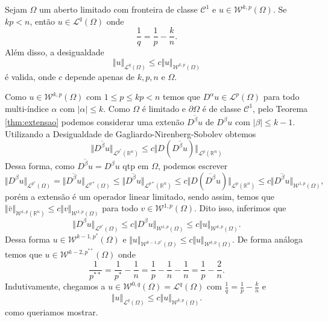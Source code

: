 \documentclass[a4paper, 11pt]{book}
\theoremstyle{definition}
\newcommand{\bR}{\mathbb{R}}
\newcommand{\cC}{\mathcal{C}}
\newcommand{\cL}{\mathcal{L}}
\newcommand{\cW}{\mathcal{W}}
\begin{document}
\begin{tbox} \label{thm:geral-1}
    Sejam $\Omega$ um aberto limitado com fronteira de classe $\cC^1$ e $u \in \cW^{k,p}(\Omega)$.
    Se $kp < n$, então $u \in \cL^q(\Omega)$ onde
    \[
        \frac{1}{q} = \frac{1}{p} - \frac{k}{n}.
    \]
    Além disso, a desigualdade
    \[
        \Vert u \Vert_{\cL^q(\Omega)} \leqslant c \Vert u \Vert_{\cW^{k,p}(\Omega)}
    \]
    é valida, onde $c$ depende apenas de $k, p, n$ e $\Omega$.
\end{tbox}
\begin{prf}
    Como $u \in \cW^{k,p}(\Omega)$ com $1 \leqslant p \leqslant kp < n$ temos que $D^\alpha u \in \cL^p(\Omega)$ para todo multi-índice $\alpha$ com $|\alpha| \leqslant k$. 
    Como $\Omega$ é limitado e $\partial\Omega$ é de classe $\cC^1$, pelo Teorema \ref{thm:extensao} podemos considerar uma extenão $\overline{D^\beta u}$ de $D^\beta u$ com $|\beta| \leqslant k -1$. 
    Utilizando a Desigualdade de Gagliardo-Nirenberg-Sobolev obtemos
    \[
        \Vert \overline{D^\beta u} \Vert_{\cL^{p^*}(\bR^n)} \leqslant c \Vert D (\overline{D^\beta u}) \Vert_{\cL^p(\bR^ n)}
    \]
    Dessa forma, como $\overline{D^\beta u} = D^\beta u$ qtp em $\Omega$, podemos escrever
    \[
        \Vert D^\beta u \Vert_{\cL^{p^*}(\Omega)} = \Vert \overline{D^\beta u} \Vert_{\cL^{p*}(\Omega)} \leqslant \Vert \overline{D^\beta u} \Vert_{\cL^{p*}(\bR^n)} \leqslant c \Vert D (\overline{D^\beta}u) \Vert_{\cL^p(\bR^ n)} \leqslant c \Vert \overline{D^\beta u} \Vert_{\cW^{1,p}(\Omega)},
    \]
    porém a extensão é um operador linear limitado, sendo assim, temos que $\Vert \bar v \Vert_{\cW^{1,p}(\bR^n)} \leqslant c \Vert v \Vert_{\cW^{1,p}(\Omega)}$ para todo $v \in \cW^{1,p}(\Omega)$. Dito isso, inferimos que
    \[
        \Vert D^\beta u \Vert_{\cL^{p^*}(\Omega)} \leqslant c \Vert D^\beta u \Vert_{\cW^{1,p}(\Omega)} \leqslant c \Vert u \Vert_{\cW^{k,p}(\Omega)}.
    \]
    Dessa forma $u \in \cW^{k-1,p^*}(\Omega)$ e $\Vert u \Vert_{\cW^{k-1,p^*}(\Omega)} \leqslant c \Vert u \Vert_{\cW^{k,p}(\Omega)}$.
    De forma análoga temos que $u \in \cW^{k-2,p^{**}}(\Omega)$ onde
    \[
        \frac{1}{p^{**}} = \frac{1}{p^*} - \frac{1}{n} = \frac{1}{p} - \frac{1}{n} - \frac{1}{n} = \frac{1}{p} - \frac{2}{n}.
    \]
    Indutivamente, chegamos a $u \in \cW^{0,q}(\Omega) = \cL^q(\Omega)$ com $\frac{1}{q} = \frac{1}{p} - \frac{k}{n}$ e
    \[
        \Vert u \Vert_{\cL^q(\Omega)} \leqslant c \Vert u \Vert_{\cW^{k,p}(\Omega)}.
    \]
    como queriamos mostrar.
\end{prf}
\end{document}
